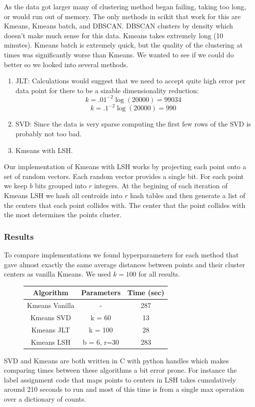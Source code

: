 \documentclass[12pt]{article}
\numberwithin{equation}{section}
\begin{document}
As the data got larger many of clustering method began failing, taking too long, or 
would run out of memory. The only methods in scikit that work for this are Kmeans, Kmeans batch, and DBSCAN. 
DBSCAN clusters by density which doesn't make much sense for this data. Kmeans takes extremely long (10 minutes). 
Kmeans batch is extremely quick, but the quality of the clustering at times was significantly worse than Kmeans. 
We wanted to see if we could do better so we looked into several methods.
\begin{enumerate}
\item JLT: Calculations would suggest that we need to accept quite high error per data point for there to be a sizable dimensionality reduction:
 $$k = .01^{-2} \log(20000) = 99034$$
 $$k = .1^{-2} \log(20000) = 990$$
\item SVD: Since the data is very sparse computing the first few rows of the SVD is probably not too bad. 
\item Kmeans with LSH. 
\end{enumerate} 
Our implementation of Kmeans with LSH works by projecting each point onto a set of random vectors. Each random 
vector provides a single bit. For each point we keep $b$ bits grouped into $r$ integers. 
At the begining of each iteration of Kmeans LSH we hash all centroids into $r$ hash tables and then 
generate a list of the centers that each point collides with. The center that the point collides
with the most determines the points cluster. 

\subsubsection*{Results}
To compare implementations we found hyperparameters for each method that gave almost exactly the same 
 average distances between points and their cluster centers as vanilla Kmeans. We used $k = 100$ for all results. 
\begin{figure}[h!]
	\centering
	\begin{tabular}{|c|c|c|}
		\hline Algorithm & Parameters & Time (sec)\\ 
		\hline Kmeans Vanilla & - & 287 \\ 
		\hline Kmeans SVD & k = 60 & 13 \\ 
		\hline Kmeans JLT & k = 100 & 28 \\ 
		\hline Kmeans LSH & b = 6, r=30 & 283\\ 
		\hline 
	\end{tabular} 
\end{figure}
SVD and Kmeans are both written in C with python handles which makes comparing times between these algorithms a bit 
error prone. For instance the label assignment code that maps 
points to centers in LSH takes cumulatively around 210 seconds to run and most of this time is from a single max 
operation over a dictionary of counts. 
\end{document}
